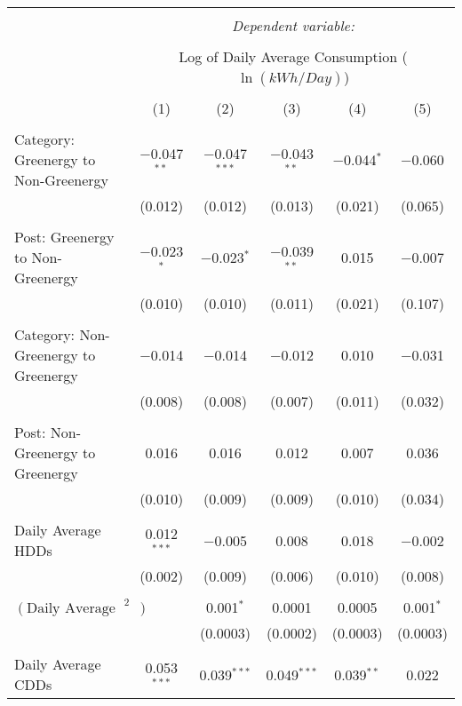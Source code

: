 \begin{table}[!htbp] \centering 
  \caption{} 
  \label{} 
\footnotesize 
\begin{adjustbox}{scale = 0.95}
\begin{tabular}{@{\extracolsep{5pt}}lccccc} 
\\[-1.8ex]\hline 
\hline \\[-1.8ex] 
 & \multicolumn{5}{c}{\textit{Dependent variable:}} \\ 
\cline{2-6} 
\\[-1.8ex] & \multicolumn{5}{c}{Log of Daily Average Consumption ($\ln(kWh/Day)$)} \\ 
\\[-1.8ex] & (1) & (2) & (3) & (4) & (5)\\ 
\hline \\[-1.8ex] 
 Category: Greenergy to Non-Greenergy & $-$0.047$^{**}$ & $-$0.047$^{***}$ & $-$0.043$^{**}$ & $-$0.044$^{*}$ & $-$0.060 \\ 
  & (0.012) & (0.012) & (0.013) & (0.021) & (0.065) \\ 
  & & & & & \\ 
 Post: Greenergy to Non-Greenergy & $-$0.023$^{*}$ & $-$0.023$^{*}$ & $-$0.039$^{**}$ & 0.015 & $-$0.007 \\ 
  & (0.010) & (0.010) & (0.011) & (0.021) & (0.107) \\ 
  & & & & & \\ 
 Category: Non-Greenergy to Greenergy & $-$0.014 & $-$0.014 & $-$0.012 & 0.010 & $-$0.031 \\ 
  & (0.008) & (0.008) & (0.007) & (0.011) & (0.032) \\ 
  & & & & & \\ 
 Post: Non-Greenergy to Greenergy & 0.016 & 0.016 & 0.012 & 0.007 & 0.036 \\ 
  & (0.010) & (0.009) & (0.009) & (0.010) & (0.034) \\ 
  & & & & & \\ 
 Daily Average HDDs & 0.012$^{***}$ & $-$0.005 & 0.008 & 0.018 & $-$0.002 \\ 
  & (0.002) & (0.009) & (0.006) & (0.010) & (0.008) \\ 
  & & & & & \\ 
 $(\text{Daily Average HDDs})^{2}$ &  & 0.001$^{*}$ & 0.0001 & 0.0005 & 0.001$^{*}$ \\ 
  &  & (0.0003) & (0.0002) & (0.0003) & (0.0003) \\ 
  & & & & & \\ 
 Daily Average CDDs & 0.053$^{***}$ & 0.039$^{***}$ & 0.049$^{***}$ & 0.039$^{**}$ & 0.022 \\ 

\end{tabular}
\end{adjustbox}
\end{table}
